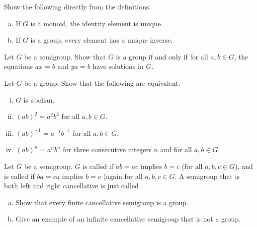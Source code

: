 \documentclass{problemset}
\begin{document}
\begin{exercise} Show the following directly from the definitions:
\begin{enumerate}[(a)]
\item If \(G\) is a monoid, the identity element is unique. 
\item If \(G\) is a group, every element has a unique inverse.
\end{enumerate}
\end{exercise}


\begin{exercise}
Let \(G\) be a semigroup. Show that \(G\) is a group if and only if for all \(a,b \in G\), the equations \(ax=b\) and \(ya=b\) have solutions in \(G\).
\end{exercise}


\begin{exercise}
Let \(G\) be a group.  Show that the following are equivalent:
\begin{enumerate}[(i)]
\item \(G\) is abelian.
\item \((ab)^2=a^2b^2\) for all \(a,b \in G\).
\item \((ab)^{-1}=a^{-1}b^{-1}\) for all \(a,b \in G\).
\item \((ab)^n=a^nb^n\) for three consecutive integers \(n\) and for all \(a,b \in G\).
\end{enumerate}
\end{exercise}



\begin{exercise}
Let \(G\) be a semigroup. \(G\) is called  if \(ab=ac\) implies \(b=c\) (for all \(a,b,c \in G\)), and is called  if \(ba=ca\) implies \(b=c\) (again for all \(a,b,c \in G\).  A semigroup that is both left and right cancellative is just called . 
\begin{enumerate}[(a)]
\item Show that every finite cancellative semigroup is a group.
\item Give an example of an infinite cancellative semigroup that is not a group.
\end{enumerate}
\end{exercise}
\end{document}
